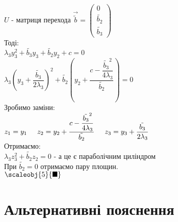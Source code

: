 \documentclass[a4paper, 10pt]{article}
\theoremstyle{theoremdd}
\begin{document}
$U$ - матриця перехода $\vec{\tilde{b}} = \begin{pmatrix}
0 \\ \tilde{b_2} \\ \tilde{b_3}
\end{pmatrix}$\\
Тоді:\\
$\lambda_3 y_3^2 + \tilde{b_3} y_3 + \tilde{b_2} y_2 + c = 0$\\
$\lambda_3 \left(y_3 + \dfrac{\tilde{b_3}}{2 \lambda_3} \right)^2 + \tilde{b_2} \left(y_2 + \dfrac{c - \dfrac{\tilde{b_3}^2}{4\lambda_3}}{\tilde{b_2}} \right) = 0$\\
Зробимо заміни:\\
$z_1 = y_1 \hspace{0.5cm}
z_2 = y_2 + \dfrac{c - \dfrac{\tilde{b_3}^2}{4\lambda_3}}{\tilde{b_2}} \hspace{0.5cm}
z_3 = y_3 + \dfrac{\tilde{b_3}}{2 \lambda_3}
$\\
Отримаємо:\\
$\lambda_3 z_3^2 + \tilde{b_2} z_2 = 0$ - а це є параболічним циліндром\\
При $\tilde{b_2} = 0$ отримаємо пару площин.\\
$\scaleobj{5}{\blacksquare}$
\newpage

\iffalse
\section{Альтернативні пояснення}
\end{document}
